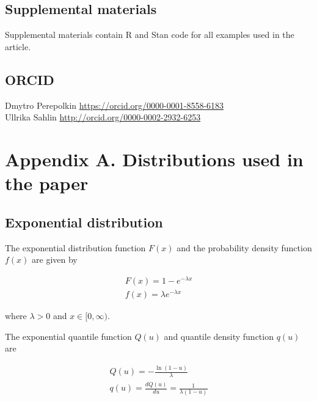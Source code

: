 \documentclass[
  12pt,
]{article}
\begin{document}
\hypertarget{supplemental-materials}{%
\subsection*{Supplemental materials}\label{supplemental-materials}}

Supplemental materials contain R and Stan code for all examples used in the article.

\hypertarget{orcid}{%
\subsection*{ORCID}\label{orcid}}

Dmytro Perepolkin \url{https://orcid.org/0000-0001-8558-6183}\\
Ullrika Sahlin \url{http://orcid.org/0000-0002-2932-6253}

\hypertarget{appendix-a.-distributions-used-in-the-paper}{%
\section*{Appendix A. Distributions used in the paper}\label{appendix-a.-distributions-used-in-the-paper}}

\hypertarget{exponential-distribution}{%
\subsection*{Exponential distribution}\label{exponential-distribution}}

The exponential distribution function \(F(x)\) and the probability density function \(f(x)\) are given by

\[
\begin{gathered}
F(x)=1-e^{-\lambda x} \\ 
f(x)=\lambda e^{-\lambda x}
\end{gathered}
\]

where \(\lambda>0\) and \(x\in[0,\infty)\).

The exponential quantile function \(Q(u)\) and quantile density function \(q(u)\) are

\[
\begin{gathered}
Q(u)=-\frac{\ln(1-u)}{\lambda}\\ 
q(u)=\frac{dQ(u)}{du}=\frac{1}{\lambda(1-u)}
\end{gathered}
\]
\end{document}
